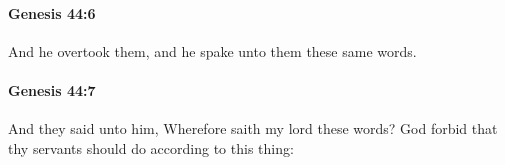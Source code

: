 		\paragraph{Genesis 44:6} %
			\label{GENESIS-44-6}

			And he overtook them, and he spake unto them these same words.


		\paragraph{Genesis 44:7} %
			\label{GENESIS-44-7}

			And they said unto him, Wherefore saith my lord these words? God forbid that thy servants should do according to this thing:



